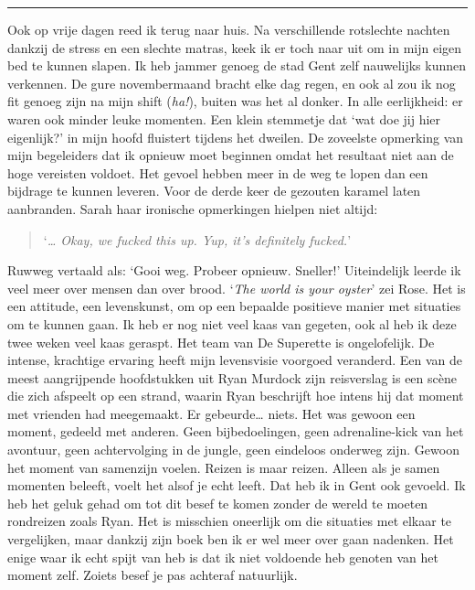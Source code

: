 \documentclass[
  11pt,
  dutch,
]{memoir}
\begin{document}
\pfbreak

Ook op vrije dagen reed ik terug naar huis. Na verschillende rotslechte
nachten dankzij de stress en een slechte matras, keek ik er toch naar
uit om in mijn eigen bed te kunnen slapen. Ik heb jammer genoeg de stad
Gent zelf nauwelijks kunnen verkennen. De gure novembermaand bracht elke
dag regen, en ook al zou ik nog fit genoeg zijn na mijn shift
(\emph{ha!}), buiten was het al donker. In alle eerlijkheid: er waren
ook minder leuke momenten. Een klein stemmetje dat `wat doe jij hier
eigenlijk?' in mijn hoofd fluistert tijdens het dweilen. De zoveelste
opmerking van mijn begeleiders dat ik opnieuw moet beginnen omdat het
resultaat niet aan de hoge vereisten voldoet. Het gevoel hebben meer in
de weg te lopen dan een bijdrage te kunnen leveren. Voor de derde keer
de gezouten karamel laten aanbranden. Sarah haar ironische opmerkingen
hielpen niet altijd:

\begin{quote}
`\emph{\ldots{} Okay, we fucked this up. Yup, it's definitely fucked.}'
\end{quote}

Ruwweg vertaald als: `Gooi weg. Probeer opnieuw. Sneller!' Uiteindelijk
leerde ik veel meer over mensen dan over brood. `\emph{The world is your
oyster}' zei Rose. Het is een attitude, een levenskunst, om op een
bepaalde positieve manier met situaties om te kunnen gaan. Ik heb er nog
niet veel kaas van gegeten, ook al heb ik deze twee weken veel kaas
geraspt. Het team van De Superette is ongelofelijk. De intense,
krachtige ervaring heeft mijn levensvisie voorgoed veranderd. Een van de
meest aangrijpende hoofdstukken uit Ryan Murdock zijn reisverslag is een
scène die zich afspeelt op een strand, waarin Ryan beschrijft hoe intens
hij dat moment met vrienden had meegemaakt. Er gebeurde\ldots{} niets.
Het was gewoon een moment, gedeeld met anderen. Geen bijbedoelingen,
geen adrenaline-kick van het avontuur, geen achtervolging in de jungle,
geen eindeloos onderweg zijn. Gewoon het moment van samenzijn voelen.
Reizen is maar reizen. Alleen als je samen momenten beleeft, voelt het
alsof je echt leeft. Dat heb ik in Gent ook gevoeld. Ik heb het geluk
gehad om tot dit besef te komen zonder de wereld te moeten rondreizen
zoals Ryan. Het is misschien oneerlijk om die situaties met elkaar te
vergelijken, maar dankzij zijn boek ben ik er wel meer over gaan
nadenken. Het enige waar ik echt spijt van heb is dat ik niet voldoende
heb genoten van het moment zelf. Zoiets besef je pas achteraf
natuurlijk.
\end{document}
